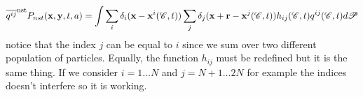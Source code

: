 \begin{equation}
    \overline{q^{ij}}^\text{nst}P_{nst}(\textbf{x},\textbf{y},t,a)= \int \sum_{i}\delta_i(\textbf{x}-\textbf{x}^i(\mathscr{C},t))
    \sum_{j}\delta_j(\textbf{x}+\textbf{r}-\textbf{x}^j(\mathscr{C},t)) h_{ij}(\mathscr{C},t) q^{ij}(\mathscr{C},t) d\mathscr{P} 
\end{equation}
notice that the index $j$ can be equal to $i$ since we sum over two different population of particles. 
Equally, the function $h_{ij}$ must be redefined but it is the same thing. 
If we consider $i=1\ldots N$ and $j = N+1\ldots 2N$ for example the indices doesn't interfere so it is working. 